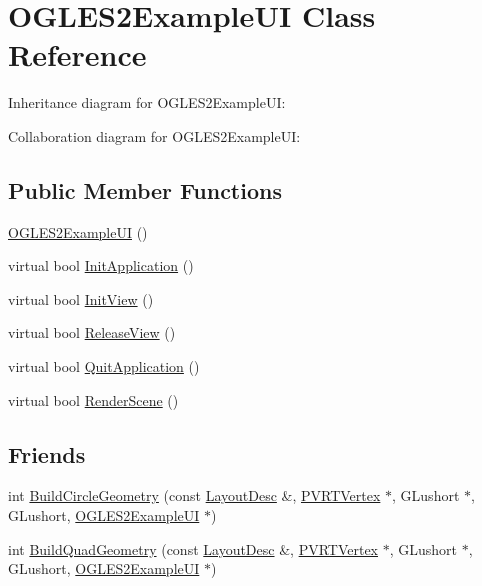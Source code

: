 \hypertarget{class_o_g_l_e_s2_example_u_i}{\section{O\+G\+L\+E\+S2\+Example\+U\+I Class Reference}
\label{class_o_g_l_e_s2_example_u_i}
}


Inheritance diagram for O\+G\+L\+E\+S2\+Example\+U\+I\+:


Collaboration diagram for O\+G\+L\+E\+S2\+Example\+U\+I\+:
\subsection*{Public Member Functions}
\begin{DoxyCompactItemize}
\item 
\hyperlink{class_o_g_l_e_s2_example_u_i_ac9c861684903b836f8ae0e05b89d61c0}{O\+G\+L\+E\+S2\+Example\+U\+I} ()
\item 
virtual bool \hyperlink{class_o_g_l_e_s2_example_u_i_a158a3646da6ce4d9af0e6bed7e8f365e}{Init\+Application} ()
\item 
virtual bool \hyperlink{class_o_g_l_e_s2_example_u_i_a1bf3bf10e175c5d2ea708aad107c16ba}{Init\+View} ()
\item 
virtual bool \hyperlink{class_o_g_l_e_s2_example_u_i_aefca40d3aa53b32d151719aaa6208d39}{Release\+View} ()
\item 
virtual bool \hyperlink{class_o_g_l_e_s2_example_u_i_ad7ea5b6044eab7a3da0906a765036f9f}{Quit\+Application} ()
\item 
virtual bool \hyperlink{class_o_g_l_e_s2_example_u_i_a555be05655ed72fedc72c3d37c34e09c}{Render\+Scene} ()
\end{DoxyCompactItemize}
\subsection*{Friends}
\begin{DoxyCompactItemize}
\item 
int \hyperlink{class_o_g_l_e_s2_example_u_i_ab2aeca0b5237af49814ad4b7b4b01703}{Build\+Circle\+Geometry} (const \hyperlink{struct_layout_desc}{Layout\+Desc} \&, \hyperlink{struct_p_v_r_t_vertex}{P\+V\+R\+T\+Vertex} $\ast$, G\+Lushort $\ast$, G\+Lushort, \hyperlink{class_o_g_l_e_s2_example_u_i}{O\+G\+L\+E\+S2\+Example\+U\+I} $\ast$)
\item 
int \hyperlink{class_o_g_l_e_s2_example_u_i_a509bb7e414864cd9e9be0cac8a54a4eb}{Build\+Quad\+Geometry} (const \hyperlink{struct_layout_desc}{Layout\+Desc} \&, \hyperlink{struct_p_v_r_t_vertex}{P\+V\+R\+T\+Vertex} $\ast$, G\+Lushort $\ast$, G\+Lushort, \hyperlink{class_o_g_l_e_s2_example_u_i}{O\+G\+L\+E\+S2\+Example\+U\+I} $\ast$)
\end{DoxyCompactItemize}


